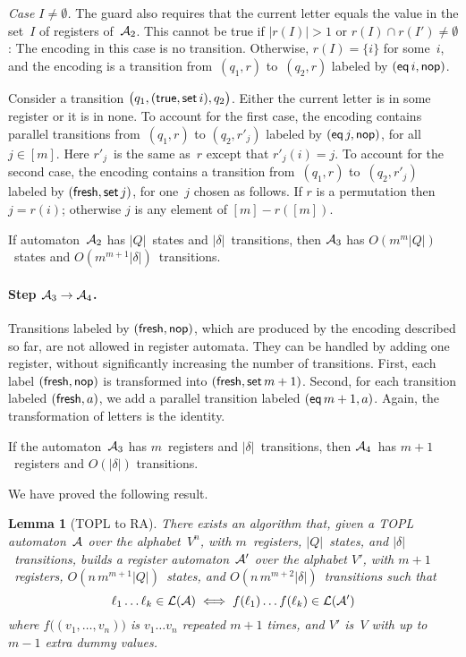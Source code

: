 \documentclass[9pt, preprint]{sigplanconf} %
\newtheorem{lemma}{Lemma}
\theoremstyle{definition}
\theoremstyle{remark}
\begin{document}
\emph{Case $I\ne\emptyset$.}\quad
The guard also requires that the current letter equals the value in the set~$I$ of registers of~${\cal A}_2$.
This cannot be true if $|r(I)|>1$ or $r(I)\cap r(I')\ne\emptyset$: The encoding in this case is no transition.
Otherwise, $r(I)=\{i\}$ for some~$i$, and the encoding is a transition from~$(q_1,r)$ to~$(q_2,r)$ labeled by $({\sf eq}\,i,{\sf nop})$.

\smallskip
Consider a transition $\bigl(q_1,({\sf true},{\sf set}\,i),q_2\bigr)$.
Either the current letter is in some register or it is in none.
To account for the first case, the encoding contains parallel transitions from~$(q_1,r)$ to $(q_2,r'_j)$ labeled by $({\sf eq}\,j,{\sf nop})$, for all $j\in[m]$.
Here $r'_j$~is the same as~$r$ except that $r'_j(i)=j$.
To account for the second case, the encoding contains a transition from~$(q_1,r)$ to~$(q_2,r'_j)$ labeled by $({\sf fresh},{\sf set}\,j)$, for one~$j$ chosen as follows.
If $r$ is a permutation then $j=r(i)$; otherwise $j$ is any element of $[m]-r([m])$.

\smallskip
If automaton~${\cal A}_2$ has $|Q|$~states and $|\delta|$~transitions, then ${\cal A}_3$ has $O(m^m|Q|)$~states and $O(m^{m+1}|\delta|)$~transitions.

\paragraph{Step ${\cal A}_3\to{\cal A}_4$.}
Transitions labeled by $({\sf fresh},{\sf nop})$, which are produced by the encoding described so far, are not allowed in register automata.
They can be handled by adding one register, without significantly increasing the number of transitions.
First, each label $({\sf fresh},{\sf nop})$ is transformed into $({\sf fresh},{\sf set}\,m+1)$.
Second, for each transition labeled $({\sf fresh},a)$, we add a parallel transition labeled $({\sf eq}\,m+1,a)$.
Again, the transformation of letters is the identity.

If the automaton~${\cal A}_3$ has $m$~registers and $|\delta|$~transitions, then ${\cal A}_4$~has $m+1$~registers and $O(|\delta|)$ transitions.

\smallskip
We have proved the following result.

\begin{lemma}[TOPL to RA]\label{lemma:topl-to-ra}
There exists an algorithm that, given a TOPL automaton~${\cal A}$ over the alphabet~$V^n$, with $m$~registers, $|Q|$~states, and $|\delta|$~transitions, builds a register automaton~${\cal A}'$ over the alphabet $V'$, with $m+1$~registers, $O(n\,m^{m+1}|Q|)$~states, and $O(n\,m^{m+2}|\delta|)$~transitions such that
\[\ell_1\ldots \ell_k\in{\cal L}({\cal A}) \iff
  f(\ell_1)\ldots f(\ell_k)\in{\cal L}({\cal A}') \]
where $f\bigl((v_1,\ldots,v_n)\bigr)$ is $v_1\ldots v_n$ repeated $m+1$ times, and $V'$ is~$V$ with up to $m-1$ extra dummy values.
\end{lemma}
\end{document}
